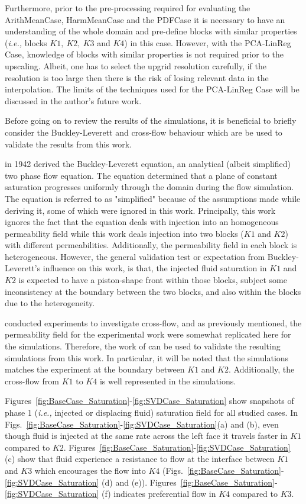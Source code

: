 \documentclass[preprint,12pt]{elsarticle}
\newcommand{\ie}{{\it i.e., }}
\begin{document}
Furthermore, prior to the pre-processing required for evaluating the ArithMeanCase, HarmMeanCase and the PDFCase it is necessary to have an understanding of the whole domain and pre-define blocks with similar properties (\ie blocks $K1,~K2,~K3$ and $K4$) in this case. However, with the PCA-LinReg Case, knowledge of blocks with similar properties is not required prior to the upscaling. Albeit, one has to select the upgrid resolution carefully, if the resolution is too large then there is the risk of losing relevant data in the interpolation. The limits of the techniques used for the PCA-LinReg Case will be discussed in the author's future work.

Before going on to review the results of the simulations, it is beneficial to briefly consider the Buckley-Leverett and cross-flow behaviour which are be used to validate the results from this work. 

\citet{buckley_1942} in 1942 derived the Buckley-Leverett equation, an analytical (albeit simplified) two phase flow equation. The equation determined that a plane of constant saturation progresses uniformly through the domain during the flow simulation. The equation is referred to as "simplified" because of the assumptions made while deriving it, some of which were ignored in this work. Principally, this work ignores the fact that the equation deals with injection into an homogeneous permeability field while this work deals injection into two blocks ($K1$ and $K2$) with different permeabilities. Additionally, the permeability field in each block is heterogeneous. However, the general validation test or expectation from Buckley-Leverett's influence on this work, is that, the injected fluid saturation in $K1$ and $K2$ is expected to have a piston-shape front within those blocks, subject some inconsistency at the boundary between the two blocks, and also within the blocks due to the heterogeneity.

\citet{dawe_2008} conducted experiments to investigate cross-flow, and as previously mentioned, the permeability field for the experimental work were somewhat replicated here for the simulations. Therefore, the work of \citet{dawe_2008} can be used to validate the resulting simulations from this work. In particular, it will be noted that the simulations matches the experiment at the boundary between $K1$ and $K2$. Additionally, the cross-flow from $K1$ to $K4$ is well represented in the simulations.

Figures~\ref{fig:BaseCase_Saturation}-\ref{fig:SVDCase_Saturation} show snapshots of phase 1 (\ie injected or displacing fluid) saturation field for all studied cases. In Figs.~\ref{fig:BaseCase_Saturation}-\ref{fig:SVDCase_Saturation}(a) and (b), even though fluid is injected at the same rate across the left face it travels faster in $K1$ compared to $K2$. Figures~\ref{fig:BaseCase_Saturation}-\ref{fig:SVDCase_Saturation} (c) show that fluid experience a resistance to flow at the interface between $K1$ and $K3$ which encourages the flow into $K4$ (Figs.~\ref{fig:BaseCase_Saturation}-\ref{fig:SVDCase_Saturation} (d) and (e)). Figures~\ref{fig:BaseCase_Saturation}-\ref{fig:SVDCase_Saturation} (f) indicates preferential flow in $K4$ compared to $K3$.
\end{document}
